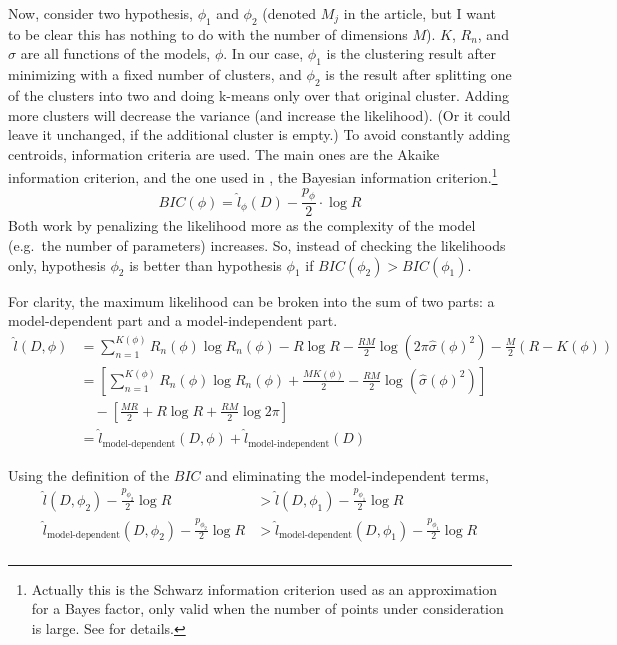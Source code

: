 \documentclass[letterpaper]{article}
\begin{document}
Now, consider two hypothesis, $\phi_1$ and $\phi_2$ (denoted $M_j$ in
the article, but I want to be clear this has nothing to do with the
number of dimensions $M$).  $K$, $R_n$, and $\sigma$ are all functions
of the models, $\phi$.  In our case, $\phi_1$ is the clustering result
after minimizing with a fixed number of clusters, and $\phi_2$ is the
result after splitting one of the clusters into two and doing k-means
only over that original cluster.  Adding more clusters will decrease
the variance (and increase the likelihood).  (Or it could leave it
unchanged, if the additional cluster is empty.)  To avoid constantly
adding centroids, information criteria are used.  The main ones are
the Akaike information criterion, and the one used in
\cite{Pelleg2000}, the Bayesian information
criterion.\footnote{Actually this is the Schwarz information criterion
  used as an approximation for a Bayes factor, only valid when the
  number of points under consideration is large.  See \cite{Kass1995}
  for details.}
\begin{equation}
  \label{eq:22}
  BIC(\phi) = \hat{l}_\phi(D) - \frac{p_{\phi}}{2} \cdot \log R
\end{equation}
Both work by penalizing the likelihood more as the complexity of the
model (e.g.\ the number of parameters) increases.  So, instead of
checking the likelihoods only, hypothesis $\phi_2$ is better than
hypothesis $\phi_1$ if $BIC(\phi_2) > BIC(\phi_1)$.

For clarity, the maximum likelihood can be broken into the sum of two
parts: a model-dependent part and a model-independent part.
\begin{align}
  \label{eq:16}
  \hat{l}(D, \phi) &= \sum_{n=1}^{K(\phi)} R_n(\phi) \log R_n(\phi) - R \log R - \frac{RM}{2} \log \left(2 \pi \hat{\sigma}(\phi)^2 \right)
                   - \frac{M}{2} \left( R - K(\phi) \right) \\
                   &= \left[ \sum_{n=1}^{K(\phi)} R_n(\phi) \log R_n(\phi) + \frac{M K(\phi)}{2} - \frac{RM}{2} \log \left( \hat{\sigma}(\phi)^2 \right) \right] \nonumber \\
                   & \quad - \left[ \frac{M R}{2} + R \log R + \frac{RM}{2} \log 2 \pi \right] \\
                   &= \hat{l}_{\text{model-dependent}}(D, \phi) + \hat{l}_{\text{model-independent}}(D)
\end{align}

Using the definition of the $BIC$ and eliminating the model-independent terms,
\begin{align}
  \hat{l}(D, \phi_2) - \frac{p_{\phi_2}}{2} \log R &> \hat{l}(D, \phi_1) - \frac{p_{\phi_1}}{2} \log R \nonumber \\
  \label{eq:17}
  \hat{l}_{\text{model-dependent}}(D, \phi_2) - \frac{p_{\phi_2}}{2} \log R &> \hat{l}_{\text{model-dependent}}(D, \phi_1) - \frac{p_{\phi_1}}{2} \log R \nonumber \\
\end{align}
\end{document}
